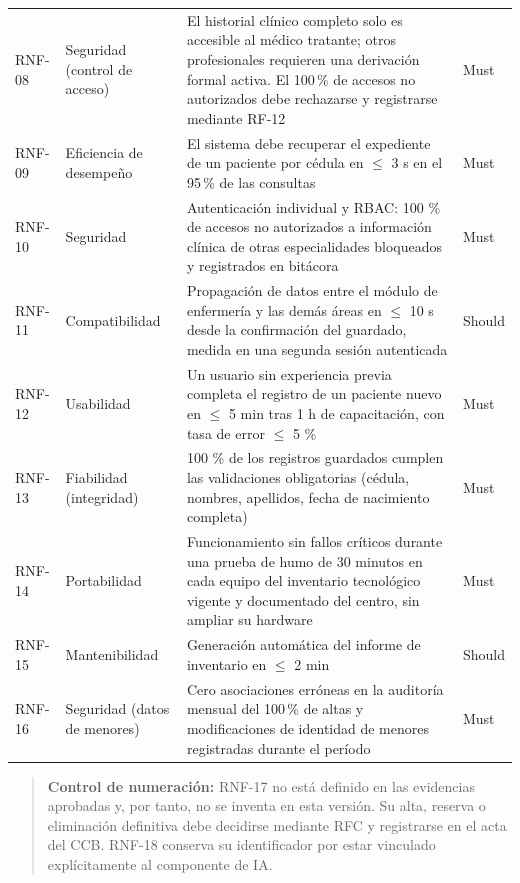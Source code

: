 \documentclass[11pt,a4paper]{article}
\begin{document}
\begin{longtable}{p{}
			p{}
			p{}
			p{}}
		RNF-08 & Seguridad (control de acceso) & El historial clínico completo solo es accesible al médico tratante; otros profesionales requieren una derivación formal activa. El 100\,\% de accesos no autorizados debe rechazarse y registrarse mediante RF-12 & Must \\
		RNF-09 & Eficiencia de desempeño & El sistema debe recuperar el expediente de un paciente por cédula en \(\leq\) 3 s en el 95\,\% de las consultas & Must \\
		RNF-10 & Seguridad & Autenticación individual y RBAC: 100 \% de accesos no autorizados a información clínica de otras especialidades bloqueados y registrados en bitácora & Must \\
		RNF-11 & Compatibilidad & Propagación de datos entre el módulo de enfermería y las demás áreas en \(\leq\) 10 s desde la confirmación del guardado, medida en una segunda sesión autenticada & Should \\
		RNF-12 & Usabilidad & Un usuario sin experiencia previa completa el registro de un paciente nuevo en \(\leq\) 5 min tras 1 h de capacitación, con tasa de error \(\leq\) 5 \% & Must \\
		RNF-13 & Fiabilidad (integridad) & 100 \% de los registros guardados cumplen las validaciones obligatorias (cédula, nombres, apellidos, fecha de nacimiento completa) & Must \\
		RNF-14 & Portabilidad & Funcionamiento sin fallos críticos durante una prueba de humo de 30 minutos en cada equipo del inventario tecnológico vigente y documentado del centro, sin ampliar su hardware & Must \\
		RNF-15 & Mantenibilidad & Generación automática del informe de inventario en \(\leq\) 2 min & Should \\
		RNF-16 & Seguridad (datos de menores) & Cero asociaciones erróneas en la auditoría mensual del 100\,\% de altas y modificaciones de identidad de menores registradas durante el período & Must \\
		\bottomrule
		
	\end{longtable}
	
	\begin{quote}
		\textbf{Control de numeración:} RNF-17 no está definido en las evidencias aprobadas y, por tanto, no se inventa en esta versión. Su alta, reserva o eliminación definitiva debe decidirse mediante RFC y registrarse en el acta del CCB. RNF-18 conserva su identificador por estar vinculado explícitamente al componente de IA.
	\end{quote}
	
\end{document}
